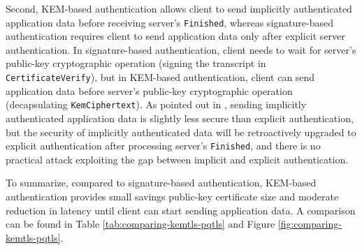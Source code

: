 \documentclass[letterpaper,12pt,titlepage,oneside,final]{book}
\begin{document}
Second, KEM-based authentication allows client to send implicitly authenticated application data before receiving server's \texttt{Finished}, whereas signature-based authentication requires client to send application data only after explicit server authentication.
In signature-based authentication, client needs to wait for server's public-key cryptographic operation (signing the transcript in \texttt{CertificateVerify}), but in KEM-based authentication, client can send application data before server's public-key cryptographic operation (decapsulating \texttt{KemCiphertext}).
As pointed out in \cite{DBLP:conf/ccs/SchwabeSW20}, sending implicitly authenticated application data is slightly less secure than explicit authentication, but the security of implicitly authenticated data will be retroactively upgraded to explicit authentication after processing server's \texttt{Finished}, and there is no practical attack exploiting the gap between implicit and explicit authentication.

To summarize, compared to signature-based authentication, KEM-based authentication provides small savings public-key certificate size and moderate reduction in latency until client can start sending application data.
A comparison can be found in Table \ref{tab:comparing-kemtls-pqtls} and Figure \ref{fig:comparing-kemtls-pqtls}.
\end{document}
